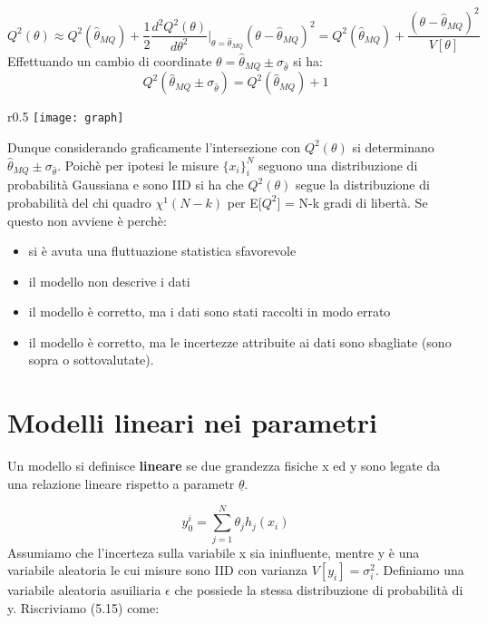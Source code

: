 \begin{equation*}
	Q^2(\theta) \approx Q^2(\hat{\theta}_{MQ}) + \dfrac{1}{2}\dfrac{d^2 Q^2(\theta)}{d\theta^2}\Big \vert_{\theta = \hat{\theta}_{MQ}}(\theta - \hat{\theta}_{MQ})^2 = Q^2(\hat{\theta}_{MQ}) + \dfrac{(\theta - \hat{\theta}_{MQ})^2}{V[\theta]}
\end{equation*}
Effettuando un cambio di coordinate $\theta = \hat{\theta}_{MQ} \pm \sigma_{\hat{\theta}}$ si ha:
\begin{equation*}
	Q^2(\hat{\theta}_{MQ} \pm \sigma_{\hat{\theta}}) = Q^2(\hat{\theta}_{MQ}) + 1
\end{equation*}
\begin{wrapfigure}[8]{r}{0.5 \textwidth}
\centering
\texttt{[image: graph]}	
\end{wrapfigure}
\newline
Dunque considerando graficamente l'intersezione con $Q^2(\theta)$ si determinano $\hat{\theta}_{MQ} \pm \sigma_{\hat{\theta}}$. Poich\`{e} per ipotesi le misure $\{x_i\}_i^N$ seguono una distribuzione di probabilit\`{a} Gaussiana e sono IID si ha che $Q^2(\theta)$ segue la distribuzione di probabilit\`{a} del chi quadro $\chi^1(N-k)$ per E[$Q^2$] = N-k gradi di libert\`{a}. Se questo non avviene \`{e} perch\`{e}:
\begin{itemize}
	\item si \`{e} avuta una fluttuazione statistica sfavorevole
	\item il modello non descrive i dati
	\item il modello \`{e} corretto, ma i dati sono stati raccolti in modo errato
	\item il modello \`{e} corretto, ma le incertezze attribuite ai dati sono sbagliate (sono sopra o sottovalutate).
\end{itemize}

\section{Modelli lineari nei parametri}

Un modello si definisce \textbf{lineare} se due grandezza fisiche x ed y sono legate da una relazione lineare rispetto a parametr $\underline{\theta}$.

\begin{equation}
	y_{0}^{i} = \sum_{j = 1}^N \theta_{j}h_{j}(x_i)
\end{equation}
Assumiamo che l'incerteza sulla variabile x sia ininfluente, mentre y \`{e} una variabile aleatoria le cui misure sono IID con varianza $V[y_i] = \sigma_i^2$. Definiamo una variabile aleatoria asuiliaria $\epsilon$ che possiede la stessa distribuzione di probabilit\`{a} di y. Riscriviamo (5.15) come:

